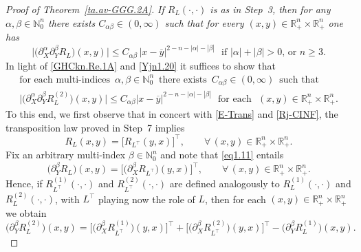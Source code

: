\documentclass[11pt,reqno]{amsart}
\numberwithin{equation}{section}
\theoremstyle{remark}
\begin{document}
\begin{proof}[Proof of Theorem~\ref{ta.av-GGG.2A}]
\vskip 0.08in
 \textit{If $R_L(\cdot,\cdot)$ is as in Step~3, then for any 
$\alpha,\beta\in\mathbb{N}_0^n$ there exists $C_{\alpha\beta}\in(0,\infty)$ such 
that for every $(x,y)\in{\mathbb{R}}^n_{+}\times{\mathbb{R}}^n_{+}$ one has}
%
\begin{equation}\label{maiTafbE}
\big|\big(\partial^\alpha_X\partial^\beta_Y R_L\big)(x,y)\big|
\leq C_{\alpha\beta}\,|x-\overline{y}|^{2-n-|\alpha|-|\beta|}\,\,
\text{ if $|\alpha|+|\beta|>0$, or $n\geq 3$}.
\end{equation}
%
In light of \eqref{GHCkn.Re.1A} and \eqref{Yjn1.20} it suffices to show that
%
\begin{equation}\label{Yjn1.GaeEE}
\begin{array}{c}
\text{for each multi-indices }\,\alpha,\beta\in\mathbb{N}_0^n
\,\text{ there exists }\,C_{\alpha\beta}\in(0,\infty)\,\text{ such that}
\\[4pt]
\big|\big(\partial^\alpha_X\partial^\beta_Y R^{(2)}_L\big)(x,y)\big|
\leq C_{\alpha\beta}|x-\overline{y}|^{2-n-|\alpha|-|\beta|}\,\,\text{ for each }\,\,
(x,y)\in{\mathbb{R}}^n_{+}\times{\mathbb{R}}^n_{+}.
\end{array}
\end{equation}
%
To this end, we first observe that in concert with \eqref{E-Trans} and
\eqref{Rj-CINF}, the transposition law proved in Step~7 implies 
%
\begin{equation}\label{eq1.11}
R_L(x,y)=\big[R_{L^\top}(y,x)\bigr]^\top,\qquad\forall\,(x,y)\in
{\mathbb{R}}^n_{+}\times{\mathbb{R}}^n_{+}.
\end{equation}
%
Fix an arbitrary multi-index
$\beta\in\mathbb{N}_0^n$ and note that \eqref{eq1.11} entails
%
\begin{equation}\label{eq1.21}
\big(\partial^\beta_Y R_L\big)(x,y)
=\Big[\big(\partial^\beta_X R_{L^\top}\big)(y,x)\Bigr]^{\top},
\qquad\forall\,(x,y)\in{\mathbb{R}}^n_{+}\times{\mathbb{R}}^n_{+}.
\end{equation}
%
Hence, if $R^{(1)}_{L^\top}(\cdot,\cdot)$ and $R^{(2)}_{L^\top}(\cdot,\cdot)$
are defined analogously to $R^{(1)}_L(\cdot,\cdot)$ and $R^{(2)}_L(\cdot,\cdot)$,
with $L^\top$ playing now the role of $L$, then
for each $(x,y)\in{\mathbb{R}}^n_{+}\times{\mathbb{R}}^n_{+}$ we obtain
%
\begin{equation}\label{eq1.21YhanPPP}
\big(\partial^\beta_Y R^{(2)}_L\big)(x,y)
=\Big[\big(\partial^\beta_X R^{(1)}_{L^\top}\big)(y,x)\Big]^{\top}
+\Big[\big(\partial^\beta_X R^{(2)}_{L^\top}\big)(y,x)\Big]^{\top}
-\big(\partial^\beta_Y R^{(1)}_L\big)(x,y).

\end{equation}
\end{proof}
\end{document}
